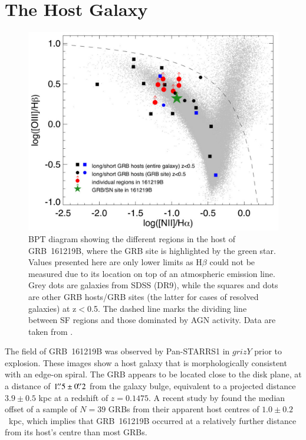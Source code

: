 \documentclass[traditabstract,longauth]{aa}
\begin{document}
\section{The Host Galaxy}
\label{sec:host}



\begin{figure}
   \includegraphics[width=\columnwidth]{Fig17_161219B_BPT-eps-converted-to.pdf}
      \caption{BPT diagram showing the different regions in the host of GRB~161219B, where the GRB site is highlighted by the green star. Values presented here are only lower limits as H$\beta$ could not be measured due to its location on top of an atmospheric emission line. Grey dots are galaxies from SDSS (DR9), while the squares and dots are other GRB hosts/GRB sites (the latter for cases of resolved galaxies) at z$<$0.5. The dashed line marks the dividing line between SF regions and those dominated by AGN activity. Data are taken from \cite{Christensen08, Berger09, Han10, Levesque10, Perley12, Thoene14, deUgarte14b, Schulze14, Stanway15,Kruehler15}.}
         \label{FigHostBPT}
   \end{figure}




The field of GRB~161219B was observed by Pan-STARRS1 in $grizY$ prior to explosion. These images show a host galaxy that is morphologically consistent with an edge-on spiral. The GRB appears to be located close to the disk plane, at a distance of $1\hbox{$.\!\!^{\prime\prime}$}5\pm0\hbox{$.\!\!^{\prime\prime}$}2$ from the galaxy bulge, equivalent to a projected distance $3.9\pm0.5$ kpc at a redshift of $z=0.1475$.  A recent study by \citet{Lyman17} found the median offset of a sample of $N=39$ GRBs from their apparent host centres of $1.0\pm0.2$~kpc, which implies that GRB~161219B occurred at a relatively further distance from its host's centre than most GRBs.
\end{document}
